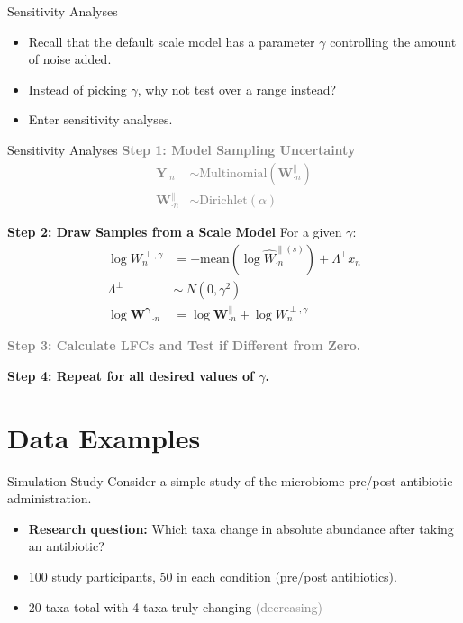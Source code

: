 \documentclass[
  ignorenonframetext,
]{beamer}
\begin{document}
\begin{frame}{Sensitivity Analyses}
\protect\hypertarget{sensitivity-analyses}{}
\begin{itemize}
\item
  Recall that the default scale model has a parameter \(\gamma\)
  controlling the amount of noise added.
\item
  Instead of picking \(\gamma\), why not test over a range instead?
\item
  Enter sensitivity analyses.
\end{itemize}
\end{frame}

\begin{frame}{Sensitivity Analyses}
\protect\hypertarget{sensitivity-analyses-1}{}
\textcolor{gray}{\textbf{Step 1: Model Sampling Uncertainty}}
\textcolor{gray}{\begin{align*}
\mathbf{Y}_{\cdot n} &\sim \text{Multinomial}(\mathbf{W}_{\cdot n}^\parallel)\\
\mathbf{W}_{\cdot n}^\parallel &\sim \text{Dirichlet}(\alpha)
\end{align*}}

\textbf{Step 2: Draw Samples from a Scale Model} For a given \(\gamma\):
\begin{align*}
\log W_{n}^{\perp, \gamma} &= - \mathrm{mean} \left(\log \hat{W}^{\parallel (s)}_{\cdot n}\right) + \Lambda^\perp x_{n}\\
\Lambda^\perp  &\sim \ N(0, \gamma^2)\\
\log \mathbf{W^\gamma}_{\cdot n} &= \log \mathbf{W}_{\cdot n}^\parallel + \log W_{n}^{\perp, \gamma}
\end{align*}

\textcolor{gray}{\textbf{Step 3: Calculate LFCs and Test if Different from Zero.}}

\textbf{Step 4: Repeat for all desired values of $\gamma$.}
\end{frame}

\hypertarget{data-examples}{%
\section{Data Examples}\label{data-examples}}

\begin{frame}{Simulation Study}
\protect\hypertarget{simulation-study}{}
Consider a simple study of the microbiome pre/post antibiotic
administration.

\begin{itemize}
\item
  \textbf{Research question:} Which taxa change in absolute abundance
  after taking an antibiotic?
\item
  100 study participants, 50 in each condition (pre/post antibiotics).
\item
  20 taxa total with 4 taxa truly changing
  \textcolor{gray}{(decreasing)}
\end{itemize}
\end{frame}
\end{document}
